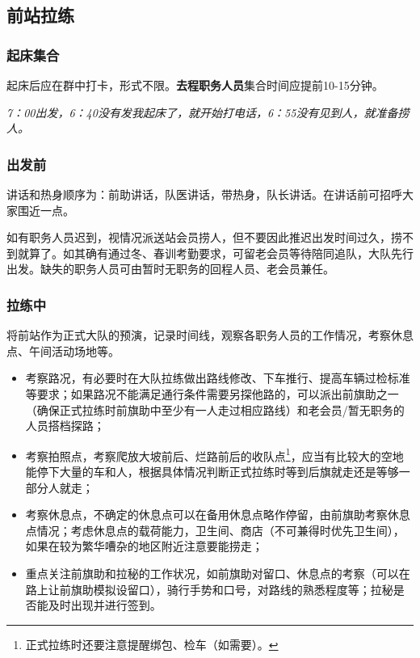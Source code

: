 \documentclass[UTF8]{ctexart}
\begin{document}
\subsection{前站拉练}

\subsubsection{起床集合}

起床后应在群中打卡，形式不限。\textbf{去程职务人员}集合时间应提前10-15分钟。

\textit{7：00出发，6：40没有发我起床了，就开始打电话，6：55没有见到人，就准备捞人。}

\subsubsection{出发前}

讲话和热身顺序为：前助讲话，队医讲话，带热身，队长讲话。在讲话前可招呼大家围近一点。

如有职务人员迟到，视情况派送站会员捞人，但不要因此推迟出发时间过久，捞不到就算了。如其确有通过冬、春训考勤要求，可留老会员等待陪同追队，大队先行出发。缺失的职务人员可由暂时无职务的回程人员、老会员兼任。

\subsubsection{拉练中}

将前站作为正式大队的预演，记录时间线，观察各职务人员的工作情况，考察休息点、午间活动场地等。

\begin{itemize}[nosep,left=4em]
    \item 考察路况，有必要时在大队拉练做出路线修改、下车推行、提高车辆过检标准等要求；如果路况不能满足通行条件需要另探他路的，可以派出前旗助之一（确保正式拉练时前旗助中至少有一人走过相应路线）和老会员/暂无职务的人员搭档探路；
    \item 考察拍照点，考察爬放大坡前后、烂路前后的收队点\footnote{正式拉练时还要注意提醒绑包、检车（如需要）。}，应当有比较大的空地能停下大量的车和人，根据具体情况判断正式拉练时等到后旗就走还是等够一部分人就走；
    \item 考察休息点，不确定的休息点可以在备用休息点略作停留，由前旗助考察休息点情况；考虑休息点的载荷能力，卫生间、商店（不可兼得时优先卫生间），如果在较为繁华嘈杂的地区附近注意要能捞走；
    \item 重点关注前旗助和拉秘的工作状况，如前旗助对留口、休息点的考察（可以在路上让前旗助模拟设留口），骑行手势和口号，对路线的熟悉程度等；拉秘是否能及时出现并进行签到。
\end{itemize}
\end{document}
